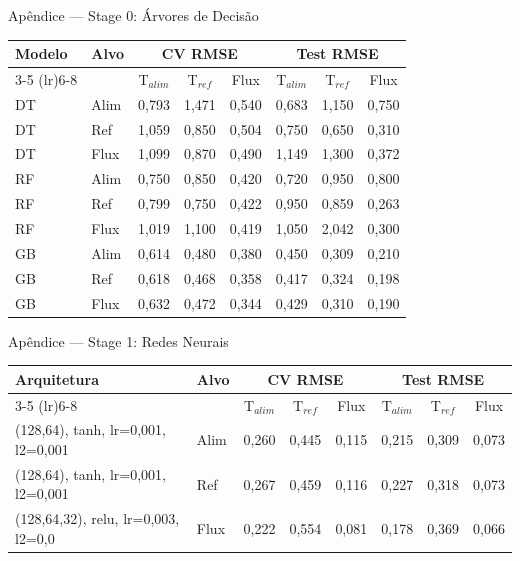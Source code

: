 \begin{slide}{Apêndice — Stage 0: Árvores de Decisão}
  \centering
  \tiny
  \begin{tabular}{llcccccc}
    \toprule
    \textbf{Modelo} & \textbf{Alvo} & \multicolumn{3}{c}{\textbf{CV RMSE}} & \multicolumn{3}{c}{\textbf{Test RMSE}} \\
    \cmidrule(lr){3-5} \cmidrule(lr){6-8}
    & & T$_{alim}$ & T$_{ref}$ & Flux & T$_{alim}$ & T$_{ref}$ & Flux \\
    \midrule
    DT & Alim & 0,793 & 1,471 & 0,540 & 0,683 & 1,150 & 0,750 \\
    \midrule
    DT & Ref & 1,059 & 0,850 & 0,504 & 0,750 & 0,650 & 0,310 \\
    \midrule
    DT & Flux & 1,099 & 0,870 & 0,490 & 1,149 & 1,300 & 0,372 \\
    \midrule
    RF & Alim & 0,750 & 0,850 & 0,420 & 0,720 & 0,950 & 0,800 \\
    \midrule
    RF & Ref & 0,799 & 0,750 & 0,422 & 0,950 & 0,859 & 0,263 \\
    \midrule
    RF & Flux & 1,019 & 1,100 & 0,419 & 1,050 & 2,042 & 0,300 \\
    \midrule
    GB & Alim & 0,614 & 0,480 & 0,380 & 0,450 & 0,309 & 0,210 \\
    \midrule
    GB & Ref & 0,618 & 0,468 & 0,358 & 0,417 & 0,324 & 0,198 \\
    \midrule
    GB & Flux & 0,632 & 0,472 & 0,344 & 0,429 & 0,310 & 0,190 \\
    \bottomrule
  \end{tabular}
\end{slide}
\begin{slide}{Apêndice — Stage 1: Redes Neurais}
  \centering
  \tiny
  \begin{tabular}{llcccccc}
    \toprule
    \textbf{Arquitetura} & \textbf{Alvo} & \multicolumn{3}{c}{\textbf{CV RMSE}} & \multicolumn{3}{c}{\textbf{Test RMSE}} \\
    \cmidrule(lr){3-5} \cmidrule(lr){6-8}
    & & T$_{alim}$ & T$_{ref}$ & Flux & T$_{alim}$ & T$_{ref}$ & Flux \\
    \midrule
    (128,64), tanh, lr=0,001, l2=0,001 & Alim & 0,260 & 0,445 & 0,115 & 0,215 & 0,309 & 0,073 \\
    (128,64), tanh, lr=0,001, l2=0,001 & Ref & 0,267 & 0,459 & 0,116 & 0,227 & 0,318 & 0,073 \\
    (128,64,32), relu, lr=0,003, l2=0,0 & Flux & 0,222 & 0,554 & 0,081 & 0,178 & 0,369 & 0,066 \\
    \bottomrule
  \end{tabular}
\end{slide}
